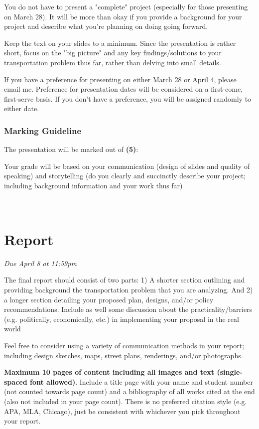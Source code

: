 \documentclass[11pt]{article}
\begin{document}
	You do not have to present a "complete" project (especially for those presenting on March 28). It will be more than okay if you provide a background for your project and describe what you're planning on doing going forward.
	
	Keep the text on your slides to a minimum. Since the presentation is rather short, focus on the "big picture" and any key findings/solutions to your transportation problem thus far, rather than delving into small details.
	
	If you have a preference for presenting on either March 28 or April 4, please email me. Preference for presentation dates will be considered on a first-come, first-serve basis. If you don't have a preference, you will be assigned randomly to either date.
	
	
	
	
	\subsubsection*{Marking Guideline}
	
	The presentation will be marked out of \textbf{(5)}:
	
	Your grade will be based on your communication (design of slides and quality of speaking) and storytelling (do you clearly and succinctly describe your project; including background information and your work thus far)
	
	
	
	
	
	\newpage
	
	
	\section*{\\Report}
	
	\textit{Due April 8 at 11:59pm}
	
	The final report should consist of two parts: 1) A shorter section outlining and providing background the transportation problem that you are analyzing. And 2) a longer section detailing your proposed plan, designs, and/or policy recommendations. Include as well some discussion about the practicality/barriers (e.g. politically, economically, etc.) in implementing your proposal in the real world
	
	Feel free to consider using a variety of communication methods in your report; including design sketches, maps, street plans, renderings, and/or photographs.
	
	\textbf{Maximum 10 pages of content including all images and text (single-spaced font allowed)}. Include a title page with your name and student number (not counted towards page count) and a bibliography of all works cited at the end (also not included in your page count). There is no preferred citation style (e.g. APA, MLA, Chicago), just be consistent with whichever you pick throughout your report. 
	
\end{document}
